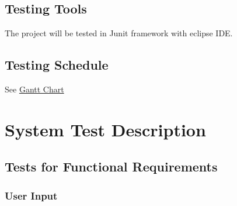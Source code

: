\documentclass[12pt, titlepage]{article}
\begin{document}
\subsection{Testing Tools}
The project will be tested in Junit framework with eclipse IDE.



\subsection{Testing Schedule}
		
See \href{https://gitlab.cas.mcmaster.ca/kongx9/3xa3-404/-/blob/master/Blankproject/ProjectSchedule/Milestone.pdf}{Gantt Chart}


\section{System Test Description}
	
\subsection{Tests for Functional Requirements}

\subsubsection{User Input}
\end{document}
